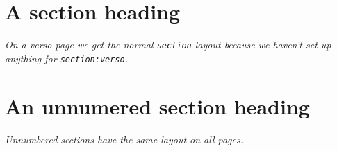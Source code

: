 \documentclass[a4paper,twoside]{article}
\begin{document}
\kant[1][3-4]

\newpage
\section{A section heading}

\emph{On a verso page we get the normal \texttt{section} layout because we
haven't set up anything for \texttt{section:verso}.}

\kant[2][1-2]

\section*{An unnumered section heading}

\emph{Unnumbered sections have the same layout on all pages.}

\kant[1][3-4]
\end{document}
